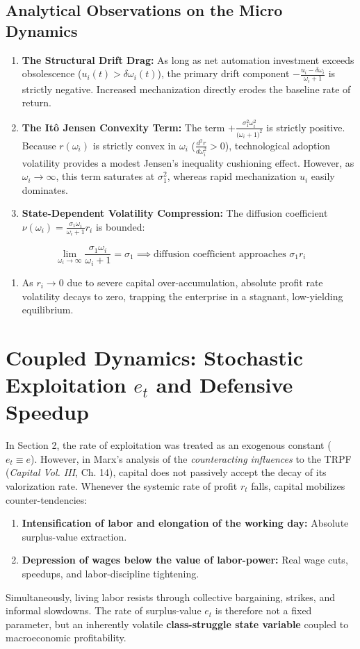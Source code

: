 \documentclass[11pt,letterpaper]{report}
\begin{document}
\subsection{Analytical Observations on the Micro Dynamics}
\begin{enumerate}
\item \textbf{The Structural Drift Drag:} As long as net automation investment exceeds obsolescence (${u}_{i}(t)>\delta {\omega }_{i}(t)$), the primary drift component $-\frac{{u}_{i}-\delta {\omega }_{i}}{{\omega }_{i}+1}$ is strictly negative. Increased mechanization directly erodes the baseline rate of return.
\item \textbf{The Itô Jensen Convexity Term:} The term $+\frac{{\sigma }_{1}^{2}{\omega }_{i}^{2}}{({\omega }_{i}+1{)}^{2}}$ is strictly positive. Because $r({\omega }_{i})$ is strictly convex in ${\omega }_{i}$ ($\frac{{d}^{2}r}{d{\omega }_{i}^{2}}>0$), technological adoption volatility provides a modest Jensen's inequality cushioning effect. However, as ${\omega }_{i}\rightarrow \infty$, this term saturates at ${\sigma }_{1}^{2}$, whereas rapid mechanization ${u}_{i}$ easily dominates.
\item \textbf{State-Dependent Volatility Compression:} The diffusion coefficient $\nu ({\omega }_{i})=\frac{{\sigma }_{1}{\omega }_{i}}{{\omega }_{i}+1}{r}_{i}$ is bounded:
\end{enumerate}
\[
\lim_{\omega_i \to \infty} \frac{\sigma_1 \omega_i}{\omega_i + 1} = \sigma_1 \implies \text{diffusion coefficient approaches } \sigma_1 r_i
\]
\begin{enumerate}
\item As ${r}_{i}\rightarrow 0$ due to severe capital over-accumulation, absolute profit rate volatility decays to zero, trapping the enterprise in a stagnant, low-yielding equilibrium.
\end{enumerate}
\section{Coupled Dynamics: Stochastic Exploitation \texorpdfstring{$e_t$}{e(t)} and Defensive Speedup}
In Section 2, the rate of exploitation was treated as an exogenous constant (${e}_{t}\equiv e$). However, in Marx's analysis of the \emph{counteracting influences} to the TRPF (\emph{Capital Vol. III}, Ch. 14), capital does not passively accept the decay of its valorization rate. Whenever the systemic rate of profit ${r}_{t}$ falls, capital mobilizes counter-tendencies:

\begin{enumerate}
\item \textbf{Intensification of labor and elongation of the working day:} Absolute surplus-value extraction.
\item \textbf{Depression of wages below the value of labor-power:} Real wage cuts, speedups, and labor-discipline tightening.
\end{enumerate}
Simultaneously, living labor resists through collective bargaining, strikes, and informal slowdowns. The rate of surplus-value ${e}_{t}$ is therefore not a fixed parameter, but an inherently volatile \textbf{class-struggle state variable} coupled to macroeconomic profitability.
\end{document}
